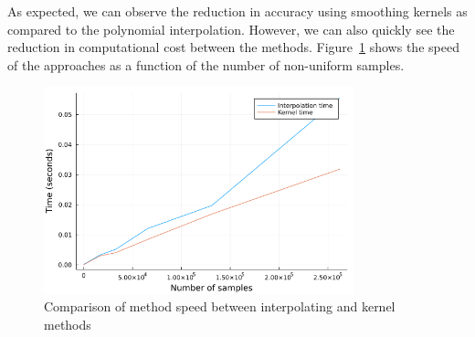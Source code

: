 As expected, we can observe the reduction in accuracy using smoothing kernels as compared to the polynomial interpolation.
However, we can also quickly see the reduction in computational cost between the methods.
Figure~\ref{fig:images-speed-png} shows the speed of the approaches as a function of the number of non-uniform samples.
\begin{figure}[htpb]
    \centering
    \includegraphics[width=0.8\textwidth]{images/speed.png}
    \caption{Comparison of method speed between interpolating and kernel methods}
    \label{fig:images-speed-png}
\end{figure}
